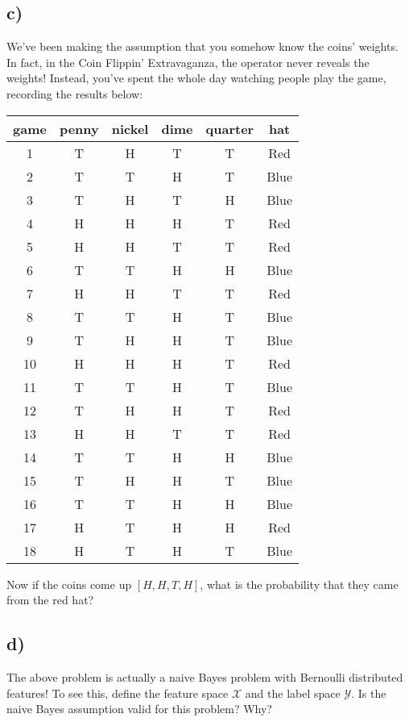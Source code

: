 \documentclass[a4paper]{article}
\begin{document}
\subsection*{c)}
We've been making the assumption that you somehow know the coins' weights. In fact, in the Coin Flippin' Extravaganza, the operator never reveals the weights! Instead, you've spent the whole day watching people play the game, recording the results below:
\begin{center}
\begin{tabular}{ c | c c c c | c }
 game & penny & nickel & dime & quarter & hat \\ 
 \hline
 1 & T & H & T & T & Red \\
 2 & T & T & H & T & Blue \\
 3 & T & H & T & H & Blue \\
 4 & H & H & H & T & Red \\
 5 & H & H & T & T & Red \\
 6 & T & T & H & H & Blue \\
 7 & H & H & T & T & Red \\
 8 & T & T & H & T & Blue \\
 9 & T & H & H & T & Blue \\
 10 & H & H & H & T & Red \\
 11 & T & T & H & T & Blue \\
 12 & T & H & H & T & Red \\
 13 & H & H & T & T & Red \\
 14 & T & T & H & H & Blue \\
 15 & T & H & H & T & Blue \\
 16 & T & T & H & H & Blue \\
 17 & H & T & H & H & Red \\
 18 & H & T & H & T & Blue
\end{tabular}
\end{center}


Now if the coins come up $[H,H,T,H]$, what is the probability that they came from the red hat?

\subsection*{d)}
The above problem is actually a naive Bayes problem with Bernoulli distributed features! To see this, define the feature space $\mathcal{X}$ and the label space $\mathcal{Y}$. Is the naive Bayes assumption valid for this problem? Why?
\end{document}
